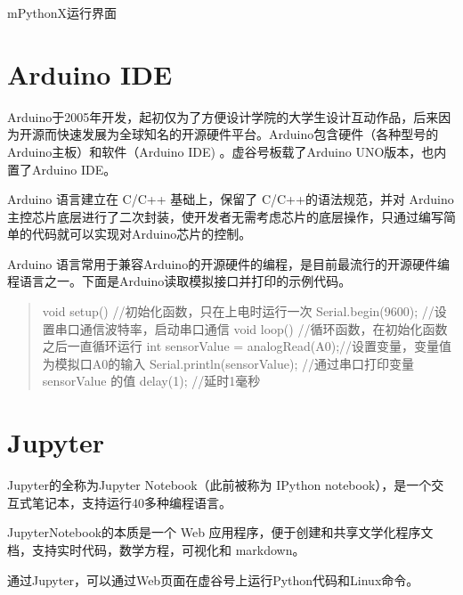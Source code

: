 \documentclass[letterpaper,10pt,english]{sphinxmanual}
\begin{document}
mPythonX运行界面

\noindent{}


\section{Arduino IDE}
\label{\detokenize{05.soft/5.3-arduino::doc}}\label{\detokenize{05.soft/5.3-arduino:arduino-ide}}
Arduino于2005年开发，起初仅为了方便设计学院的大学生设计互动作品，后来因为开源而快速发展为全球知名的开源硬件平台。Arduino包含硬件（各种型号的Arduino主板）和软件（Arduino IDE) 。虚谷号板载了Arduino UNO版本，也内置了Arduino IDE。

Arduino 语言建立在 C/C++ 基础上，保留了 C/C++的语法规范，并对 Arduino主控芯片底层进行了二次封装，使开发者无需考虑芯片的底层操作，只通过编写简单的代码就可以实现对Arduino芯片的控制。

Arduino 语言常用于兼容Arduino的开源硬件的编程，是目前最流行的开源硬件编程语言之一。下面是Arduino读取模拟接口并打印的示例代码。
\begin{quote}

\begin{sphinxVerbatim}[commandchars=\\\{\}]
void setup() \PYGZob{}                          //初始化函数，只在上电时运行一次
        Serial.begin(9600);             //设置串口通信波特率，启动串口通信
\PYGZcb{}
void loop() \PYGZob{}                           //循环函数，在初始化函数之后一直循环运行
        int sensorValue = analogRead(A0);//设置变量，变量值为模拟口A0的输入
        Serial.println(sensorValue);            //通过串口打印变量sensorValue 的值
        delay(1);                                                       //延时1毫秒
\PYGZcb{}
\end{sphinxVerbatim}
\end{quote}


\section{Jupyter}
\label{\detokenize{05.soft/5.4-Jupyter:jupyter}}\label{\detokenize{05.soft/5.4-Jupyter::doc}}
Jupyter的全称为Jupyter Notebook（此前被称为 IPython notebook），是一个交互式笔记本，支持运行40多种编程语言。

JupyterNotebook的本质是一个 Web 应用程序，便于创建和共享文学化程序文档，支持实时代码，数学方程，可视化和 markdown。

通过Jupyter，可以通过Web页面在虚谷号上运行Python代码和Linux命令。
\end{document}
